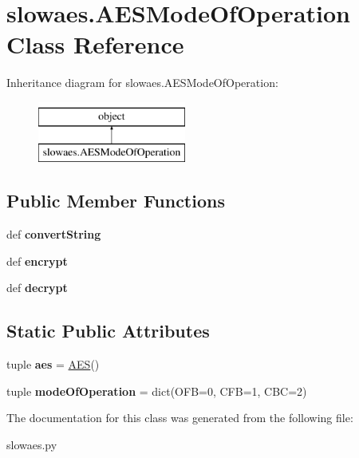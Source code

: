 \hypertarget{classslowaes_1_1_a_e_s_mode_of_operation}{\section{slowaes.\-A\-E\-S\-Mode\-Of\-Operation Class Reference}
\label{classslowaes_1_1_a_e_s_mode_of_operation}
}
Inheritance diagram for slowaes.\-A\-E\-S\-Mode\-Of\-Operation\-:\begin{figure}[H]
\begin{center}
\leavevmode
\includegraphics[height=2.000000cm]{classslowaes_1_1_a_e_s_mode_of_operation}
\end{center}
\end{figure}
\subsection*{Public Member Functions}
\begin{DoxyCompactItemize}
\item 
\hypertarget{classslowaes_1_1_a_e_s_mode_of_operation_ae5b48258fcedce545b420260d58c20df}{def {\bfseries convert\-String}}\label{classslowaes_1_1_a_e_s_mode_of_operation_ae5b48258fcedce545b420260d58c20df}

\item 
\hypertarget{classslowaes_1_1_a_e_s_mode_of_operation_a379e6dfc94dbafa6fd9d3bd9c5caa0b0}{def {\bfseries encrypt}}\label{classslowaes_1_1_a_e_s_mode_of_operation_a379e6dfc94dbafa6fd9d3bd9c5caa0b0}

\item 
\hypertarget{classslowaes_1_1_a_e_s_mode_of_operation_aa7353b4ffd4df9b274283d8a110535ed}{def {\bfseries decrypt}}\label{classslowaes_1_1_a_e_s_mode_of_operation_aa7353b4ffd4df9b274283d8a110535ed}

\end{DoxyCompactItemize}
\subsection*{Static Public Attributes}
\begin{DoxyCompactItemize}
\item 
\hypertarget{classslowaes_1_1_a_e_s_mode_of_operation_a2ba893a7e4f92bb30d43fa6c7663cc5a}{tuple {\bfseries aes} = \hyperlink{classslowaes_1_1_a_e_s}{A\-E\-S}()}\label{classslowaes_1_1_a_e_s_mode_of_operation_a2ba893a7e4f92bb30d43fa6c7663cc5a}

\item 
\hypertarget{classslowaes_1_1_a_e_s_mode_of_operation_a6c5604b7c5520fe1f35e9114132ee0c0}{tuple {\bfseries mode\-Of\-Operation} = dict(O\-F\-B=0, C\-F\-B=1, C\-B\-C=2)}\label{classslowaes_1_1_a_e_s_mode_of_operation_a6c5604b7c5520fe1f35e9114132ee0c0}

\end{DoxyCompactItemize}


The documentation for this class was generated from the following file\-:\begin{DoxyCompactItemize}
\item 
slowaes.\-py\end{DoxyCompactItemize}
